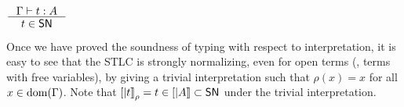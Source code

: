 \begin{corollary}
        $\inference{\Gamma |- t : A}{t \in \SN}$
\end{corollary}
Once we have proved the soundness of typing with respect to interpretation,
it is easy to see that the STLC is strongly normalizing, even for open terms
(\ie, terms with free variables), by giving a trivial interpretation
such that $\rho(x) = x$ for all $x\in\mathop{\mathrm{dom}}(\Gamma)$. Note that
$[|t|]_\rho = t \in [|A|] \subset \mathsf{SN}$ under the trivial interpretation.


\begin{comment}
\subsection{Characteristics of the Church-style STLC}\label{sec:stlc:church}

This style of proof of strong normalization extends naturally
to the Church-style STLC as well, but we do not discuss the details
here. But, there are some interesting properties that hold in Church style,
but not in Curry style, which are worth discussing. Two of them are:
\begin{itemize}
\item \emph{Uniqueness of typing}
$\qquad\inference{\Gamma |- t : A & \Gamma |- t : A'}{A = A'} $

\item \emph{Type equivalence between well-typed $\beta$-equivalent terms}
\begin{align*}
& \inference{t =_{\beta} t' & \Gamma |- t : A & \Gamma |- t' : A'}{A = A'} \\
& \text{where $=_{\beta}$ is the reflexive symmetric transitive closure of $-->$.}
\end{align*}
\end{itemize}

In Church style, the variable ($x$) in an abstraction
($\l(x:A).t$) has a type annotation ($A$). Intuitively, we may think of
the abstraction ($\l(x:A).t$) as a function that expects an argument of
the type ($A$) specified by the type annotation.




\end{comment}
